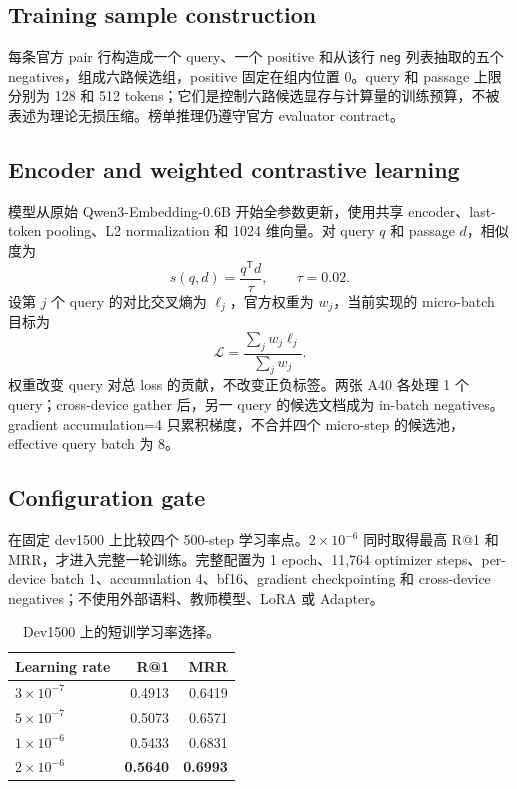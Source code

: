 \documentclass[UTF8,10pt,a4paper,twocolumn]{ctexart}
\begin{document}
\subsection{Training sample construction}

每条官方 pair 行构造成一个 query、一个 positive 和从该行 \texttt{neg} 列表抽取的五个 negatives，组成六路候选组，positive 固定在组内位置 0。query 和 passage 上限分别为 128 和 512 tokens；它们是控制六路候选显存与计算量的训练预算，不被表述为理论无损压缩。榜单推理仍遵守官方 evaluator contract。

\subsection{Encoder and weighted contrastive learning}

模型从原始 Qwen3-Embedding-0.6B 开始全参数更新，使用共享 encoder、last-token pooling、L2 normalization 和 1024 维向量。对 query $q$ 和 passage $d$，相似度为
\begin{equation}
s(q,d)=\frac{q^{\mathsf T}d}{\tau},\qquad \tau=0.02.
\end{equation}
设第 $j$ 个 query 的对比交叉熵为 $\ell_j$，官方权重为 $w_j$，当前实现的 micro-batch 目标为
\begin{equation}
\mathcal{L}=\frac{\sum_j w_j\ell_j}{\sum_j w_j}.
\end{equation}
权重改变 query 对总 loss 的贡献，不改变正负标签。两张 A40 各处理 1 个 query；cross-device gather 后，另一 query 的候选文档成为 in-batch negatives。gradient accumulation=4 只累积梯度，不合并四个 micro-step 的候选池，effective query batch 为 8。

\subsection{Configuration gate}

在固定 dev1500 上比较四个 500-step 学习率点。$2\times10^{-6}$ 同时取得最高 R@1 和 MRR，才进入完整一轮训练。完整配置为 1 epoch、11,764 optimizer steps、per-device batch 1、accumulation 4、bf16、gradient checkpointing 和 cross-device negatives；不使用外部语料、教师模型、LoRA 或 Adapter。

\begin{table}[t]
\centering
\caption{Dev1500 上的短训学习率选择。}
\label{tab:lr}
\scriptsize
\begin{tabular}{lrr}
\toprule
Learning rate & R@1 & MRR\\
\midrule
$3\times10^{-7}$ & 0.4913 & 0.6419\\
$5\times10^{-7}$ & 0.5073 & 0.6571\\
$1\times10^{-6}$ & 0.5433 & 0.6831\\
\textbf{$2\times10^{-6}$} & \textbf{0.5640} & \textbf{0.6993}\\
\bottomrule
\end{tabular}
\end{table}
\end{document}
